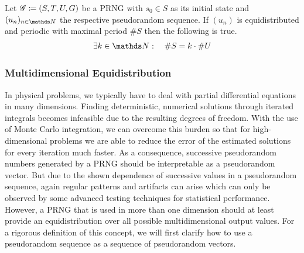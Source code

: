 \documentclass{stdlocal}
\begin{document}
  \begin{corollary}
    Let $\mathscr{G}\coloneqq (S,T,U,G)$ be a PRNG with $s_0\in S$ as its initial state and $(u_n)_{n\in\setNatural}$ the respective pseudorandom sequence.
    If $(u_n)$ is equidistributed and periodic with maximal period $\# S$ then the following is true.
    \[
      \exists k\in\setNatural:\quad \# S = k \cdot \# U
    \]
  \end{corollary}


  \subsubsection*{Multidimensional Equidistribution}
  In physical problems, we typically have to deal with partial differential equations in many dimensions.
  Finding deterministic, numerical solutions through iterated integrals becomes infeasible due to the resulting degrees of freedom.
  With the use of Monte Carlo integration, we can overcome this burden so that for high-dimensional problems we are able to reduce the error of the estimated solutions for every iteration much faster.
  As a consequence, successive pseudorandom numbers generated by a PRNG should be interpretable as a pseudorandom vector.
  But due to the shown dependence of successive values in a pseudorandom sequence, again regular patterns and artifacts can arise which can only be observed by some advanced testing techniques for statistical performance.
  However, a PRNG that is used in more than one dimension should at least provide an equidistribution over all possible multidimensional output values.
  For a rigorous definition of this concept, we will first clarify how to use a pseudorandom sequence as a sequence of pseudorandom vectors.
\end{document}
